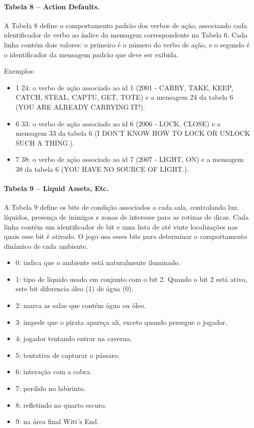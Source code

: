 \documentclass[12pt,a4paper]{article}
\begin{document}
\paragraph{Tabela 8 – Action Defaults.}  
A Tabela 8 define o comportamento padrão dos verbos de ação, associando cada identificador de verbo ao índice da mensagem correspondente na Tabela 6. Cada linha contém dois valores: o primeiro é o número do verbo de ação, e o segundo é o identificador da mensagem padrão que deve ser exibida.

Exemplos:  
\begin{itemize}
  \item 1 24: o verbo de ação associado ao id 1 (2001 - CARRY, TAKE, KEEP, CATCH, STEAL, CAPTU, GET, TOTE) e a mensagem 24 da tabela 6 (YOU ARE ALREADY CARRYING IT!). 
  \item 6 33: o verbo de ação associado ao id 6 (2006 - LOCK, CLOSE) e a mensagem 33 da tabela 6 (I DON'T KNOW HOW TO LOCK OR UNLOCK SUCH A THING.).
  \item 7 38: o verbo de ação associado ao id 7 (2007 - LIGHT, ON) e a mensagem 38 da tabela 6 (YOU HAVE NO SOURCE OF LIGHT.). 
\end{itemize}

\paragraph{Tabela 9 – Liquid Assets, Etc.}
A Tabela 9 define os bits de condição associados a cada sala, controlando luz, líquidos, presença de inimigos e zonas de interesse para as rotinas de dicas. Cada linha contém um identificador de bit e uma lista de até vinte localizações nas quais esse bit é ativado. O jogo usa esses bits para determinar o comportamento dinâmico de cada ambiente.

\begin{itemize}
  \item 0: indica que o ambiente está naturalmente iluminado.
  \item 1: tipo de líquido usado em conjunto com o bit 2. Quando o bit 2 está ativo, este bit diferencia óleo (1) de água (0).
  \item 2: marca as salas que contêm água ou óleo.
  \item 3: impede que o pirata apareça ali, exceto quando persegue o jogador.
  \item 4: jogador tentando entrar na caverna.
  \item 5: tentativa de capturar o pássaro.
  \item 6: interação com a cobra.
  \item 7: perdido no labirinto.
  \item 8: refletindo no quarto escuro.
  \item 9: na área final Witt's End.
\end{itemize}
\end{document}
